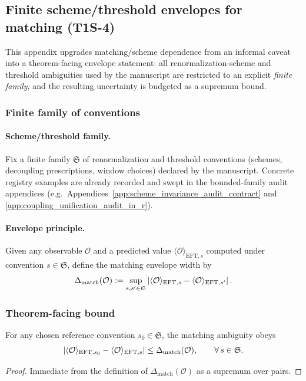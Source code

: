 \subsection{Finite scheme/threshold envelopes for matching (T1S-4)}
\label{app:matching_envelope_theoremization}

\AuditTag This appendix upgrades matching/scheme dependence from an informal caveat into a theorem-facing envelope statement: all renormalization-scheme and threshold ambiguities used by the manuscript are restricted to an explicit \emph{finite family}, and the resulting uncertainty is budgeted as a supremum bound.

\subsubsection{Finite family of conventions}
\paragraph{Scheme/threshold family.}
\MatchTag Fix a finite family $\mathfrak{S}$ of renormalization and threshold conventions (schemes, decoupling prescriptions, window choices) declared by the manuscript.
Concrete registry examples are already recorded and swept in the bounded-family audit appendices (e.g.\ Appendices~\ref{app:scheme_invariance_audit_contract} and \ref{app:coupling_unification_audit_in_r}).

\paragraph{Envelope principle.}
Given any observable $\mathcal{O}$ and a predicted value $\langle\mathcal{O}\rangle_{\mathrm{EFT},s}$ computed under convention $s\in\mathfrak{S}$, define the matching envelope width by
\[
\Delta_{\mathrm{match}}(\mathcal{O})
:=\sup_{s,s'\in\mathfrak{S}}\left\lvert \langle\mathcal{O}\rangle_{\mathrm{EFT},s}-\langle\mathcal{O}\rangle_{\mathrm{EFT},s'}\right\rvert.
\]

\subsubsection{Theorem-facing bound}
\begin{proposition}
\label{prop:matching_error_envelope}
\MathTag For any chosen reference convention $s_0\in\mathfrak{S}$, the matching ambiguity obeys
\[
\left\lvert \langle\mathcal{O}\rangle_{\mathrm{EFT},s_0}-\langle\mathcal{O}\rangle_{\mathrm{EFT},s}\right\rvert
\le \Delta_{\mathrm{match}}(\mathcal{O}),
\qquad \forall\,s\in\mathfrak{S}.
\]
\end{proposition}
\begin{proof}
Immediate from the definition of $\Delta_{\mathrm{match}}(\mathcal{O})$ as a supremum over pairs.
\end{proof}

